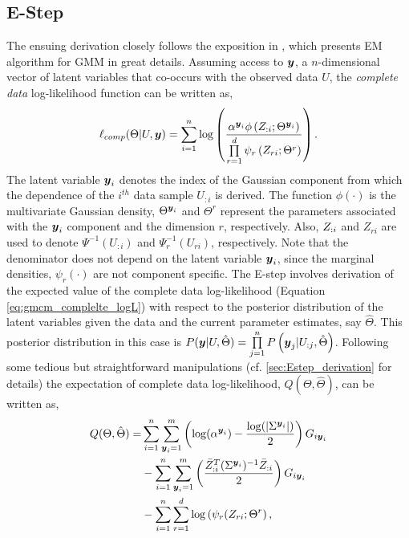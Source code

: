\documentclass{article}
\begin{document}
\subsection{E-Step} \label{subsec:EStep}
The ensuing derivation closely follows the exposition in \citet{Bilmes98agentle}, which presents EM algorithm for GMM in great details. Assuming access to $\boldsymbol{y}$, a $n$-dimensional vector of latent variables that co-occurs with the observed data $U$, the \emph{complete data} log-likelihood function can be written as,
\begin{equation}\label{eq:gmcm_complelte_logL}
\ell_{comp}(\Theta |U,\boldsymbol{y})= \sum\limits_{i=1}^{n} \log \left( \frac{\alpha^{\boldsymbol{y}_i}\phi \left(Z_{:i};\Theta^{\boldsymbol{y}_i} \right)}{\prod\limits_{r=1}^{d}\psi_{r}\left(Z_{r{i}};\Theta^r \right)} \right) .
\end{equation}
The latent variable $\boldsymbol{y}_i$ denotes the index of the Gaussian component from which the dependence of the $i^{th}$ data sample $U_{:i}$ is derived. The function $\phi(\cdot)$ is the multivariate Gaussian density,  $\Theta^{\boldsymbol{y}_i}$ and $\Theta^r$ represent the parameters associated with the $\boldsymbol{y}_i$ component and the dimension $r$, respectively. Also, $Z_{:i}$ and $Z_{ri}$ are used to denote $\Psi^{-1}\left(U_{:i}\right)$ and $ \Psi_r^{-1}(U_{ri})$, respectively. Note that the denominator does not depend on the latent variable $\boldsymbol{y}_i$, since the marginal densities, $\psi_r(\cdot)$ are not component specific. The E-step involves derivation of the expected value of the complete data log-likelihood (Equation \ref{eq:gmcm_complelte_logL}) with respect to the posterior distribution of the latent variables given the data and the current parameter estimates, say $\hat{\Theta}$. This posterior distribution in this case is $P(\boldsymbol{y}|U,\hat{\Theta}) = \prod\limits_{j=1}^{n}P\left(\boldsymbol{y}_j|U_{:j},\hat{\Theta} \right)$. Following some tedious but straightforward manipulations (cf. \ref{sec:Estep_derivation} for details) the expectation of complete data log-likelihood, $Q(\Theta,\hat{\Theta})$, can be written as,
\begin{align}\label{eq:GEM_objective}
Q(\Theta,\hat{\Theta}) =&  \sum\limits_{i=1}^n \sum\limits_{\boldsymbol{y}_i=1}^m  \left( \log (\alpha^{\boldsymbol{y}_i}) - \frac{\log(|\Sigma^{\boldsymbol{y}_i}|)}{2}\right) G_{i\boldsymbol{y}_i}  \nonumber \\ 
& -\sum\limits_{i=1}^n \sum\limits_{\boldsymbol{y}_i=1}^m  \left( \frac{\bar{Z}_{:{i}}^T(\Sigma^{\boldsymbol{y}_i})^{-1}\bar{Z}_{:{i}}}{2} \right) G_{i\boldsymbol{y}_i}  \nonumber \\
& -\sum\limits_{i=1}^n \sum\limits_{r=1}^{d} \log \left(\psi_r(Z_{ri};\Theta^r \right) ,
\end{align}
\end{document}

